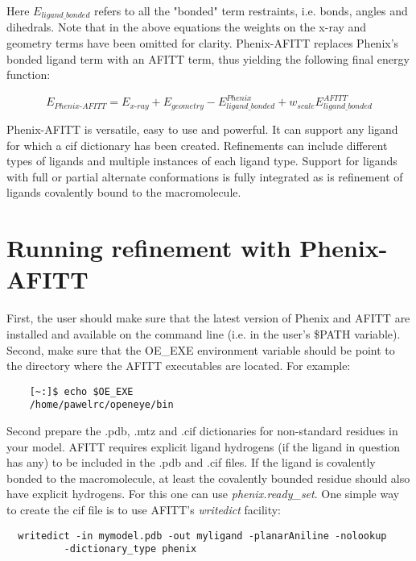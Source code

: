 \documentclass[11pt,letterpaper]{article}
\begin{document}
Here \begin{math}E_{ligand\_{}bonded}\end{math} refers to all the "bonded" term restraints, i.e. bonds, angles and dihedrals. Note that in the above equations the weights on the x-ray and geometry terms have been omitted for clarity. Phenix-AFITT replaces Phenix's bonded ligand term with an AFITT term, thus yielding the following final energy function:

\begin{equation}
E_{Phenix\text{-}AFITT}=E_{x\text{-}ray}+E_{geometry}- E_{ligand\_{}bonded}^{Phenix}+w_{scale}E_{ligand\_{}bonded}^{AFITT}
\end{equation}

Phenix-AFITT is versatile, easy to use and powerful. It can support any ligand for which a cif dictionary has been created. Refinements can include different types of ligands and multiple instances of each ligand type. Support for ligands with full or partial alternate conformations is fully integrated as is refinement of ligands covalently bound to the macromolecule. 

\section{Running refinement with Phenix-AFITT}

First, the user should make sure that the latest version of Phenix and AFITT are installed and available on the command line (i.e. in the user's \$PATH variable). Second, make sure that the OE\_{}EXE environment variable should be point to the directory where the AFITT executables are located. For example:

\begin{lstlisting}
	[~:]$ echo $OE_EXE
	/home/pawelrc/openeye/bin
\end{lstlisting}

Second prepare the .pdb, .mtz and .cif dictionaries for non-standard residues in your model. AFITT requires explicit ligand hydrogens (if the ligand in question has any) to be included in the .pdb and .cif files. If the ligand is covalently bonded to the macromolecule, at least the covalently bounded residue should also have explicit hydrogens.  For this one can use \textit{phenix.ready\_set}. One simple way to create the cif file is to use AFITT's \textit{writedict} facility:

\begin{lstlisting}
  writedict -in mymodel.pdb -out myligand -planarAniline -nolookup  
          -dictionary_type phenix
\end{lstlisting}
\end{document}
